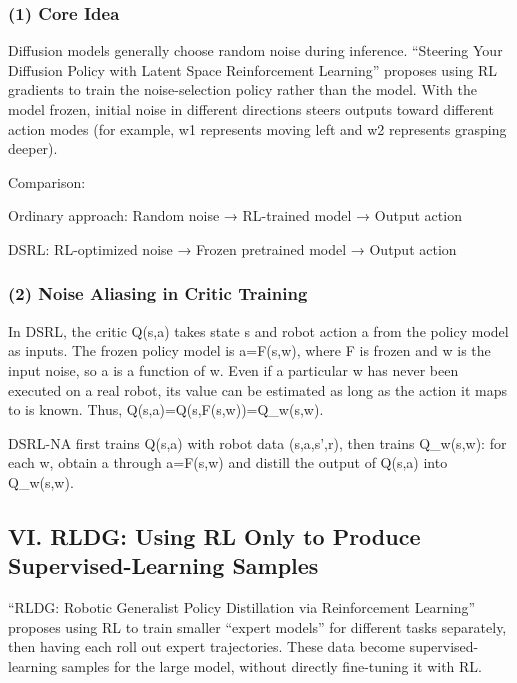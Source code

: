 \hypertarget{core-idea-4}{%
\subsubsection{(1) Core Idea}\label{core-idea-4}}

Diffusion models generally choose random noise during inference. ``Steering Your Diffusion Policy with Latent Space Reinforcement Learning'' proposes using RL gradients to train the noise-selection policy rather than the model. With the model frozen, initial noise in different directions steers outputs toward different action modes (for example, w1 represents moving left and w2 represents grasping deeper).

Comparison:

Ordinary approach: Random noise → RL-trained model → Output action

DSRL: RL-optimized noise → Frozen pretrained model → Output action

\hypertarget{noise-aliasing-in-critic-training}{%
\subsubsection{(2) Noise Aliasing in Critic Training}\label{noise-aliasing-in-critic-training}}

In DSRL, the critic Q(s,a) takes state s and robot action a from the policy model as inputs. The frozen policy model is a=F(s,w), where F is frozen and w is the input noise, so a is a function of w. Even if a particular w has never been executed on a real robot, its value can be estimated as long as the action it maps to is known. Thus, Q(s,a)=Q(s,F(s,w))=Q\_w(s,w).

DSRL-NA first trains Q(s,a) with robot data (s,a,s',r), then trains Q\_w(s,w): for each w, obtain a through a=F(s,w) and distill the output of Q(s,a) into Q\_w(s,w).

\hypertarget{vi.-rldg-using-rl-only-to-produce-supervised-learning-samples}{%
\subsection{VI. RLDG: Using RL Only to Produce Supervised-Learning Samples}\label{vi.-rldg-using-rl-only-to-produce-supervised-learning-samples}}

``RLDG: Robotic Generalist Policy Distillation via Reinforcement Learning'' proposes using RL to train smaller ``expert models'' for different tasks separately, then having each roll out expert trajectories. These data become supervised-learning samples for the large model, without directly fine-tuning it with RL.

